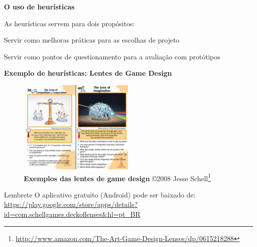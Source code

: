\expandafter\documentclass\expandafter[table, usenames, svgnames, dvipsnames, \classopts]{beamer}
\begin{document}
\begin{frame}{\textbf{O uso de heurísticas}}

	As heurísticas servem para dois propósitos:

	\begin{outline}

		\1 Servir como melhoras práticas para as escolhas de projeto

		\vspace{1em}

		\1 Servir como pontos de questionamento para a avaliação com protótipos

	\end{outline}

\end{frame}

\begin{frame}{\textbf{Exemplo de heurísticas: Lentes de Game Design}}

	\begin{figure}
		\includegraphics[height=4.5cm]{game-design-lenses}
		\caption{\tiny\textbf{Exemplos das lentes de game design} \copyright{2008} Jesse Schell\footnote{\url{http://www.amazon.com/The-Art-Game-Design-Lenses/dp/0615218288}}}
	\end{figure}

	\begin{block}{Lembrete}
		\centering
		O aplicativo gratuito (Android) pode ser baixado de:\\
		{\scriptsize \url{https://play.google.com/store/apps/details?id=com.schellgames.deckoflenses&hl=pt_BR}}
	\end{block}

	\vspace{1em}

\end{frame}
\end{document}
